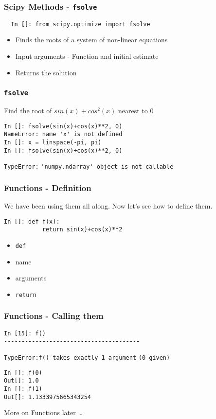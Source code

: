 \documentclass[14pt,compress]{beamer}
\newcommand{\typ}[1]{\lstinline{#1}}
\begin{document}
\begin{frame}[fragile]
\frametitle{Scipy Methods - \typ{fsolve}}
\begin{small}
\begin{lstlisting}
  In []: from scipy.optimize import fsolve
\end{lstlisting}
\end{small}
\begin{itemize}
\item Finds the roots of a system of non-linear equations
\item Input arguments - Function and initial estimate
\item Returns the solution
\end{itemize}
\end{frame}

\begin{frame}[fragile]
\frametitle{\typ{fsolve}}
Find the root of $sin(x)+cos^2(x)$ nearest to $0$
\begin{lstlisting}
In []: fsolve(sin(x)+cos(x)**2, 0)
NameError: name 'x' is not defined
In []: x = linspace(-pi, pi)
In []: fsolve(sin(x)+cos(x)**2, 0)
\end{lstlisting}
\begin{small}
\alert{\typ{TypeError:}}
\typ{'numpy.ndarray' object is not callable}
\end{small}
\end{frame}

\begin{frame}[fragile]
\frametitle{Functions - Definition}
We have been using them all along. Now let's see how to define them.
\begin{lstlisting}
In []: def f(x):
           return sin(x)+cos(x)**2
\end{lstlisting}
\begin{itemize}
\item \typ{def}
\item name
\item arguments
\item \typ{return}
\end{itemize}
\end{frame}

\begin{frame}[fragile]
\frametitle{Functions - Calling them}
\begin{lstlisting}
In [15]: f()
---------------------------------------
\end{lstlisting}
\alert{\typ{TypeError:}}\typ{f() takes exactly 1 argument}
\typ{(0 given)}
\begin{lstlisting}
In []: f(0)
Out[]: 1.0
In []: f(1)
Out[]: 1.1333975665343254
\end{lstlisting}
More on Functions later \ldots
\end{frame}
\end{document}
